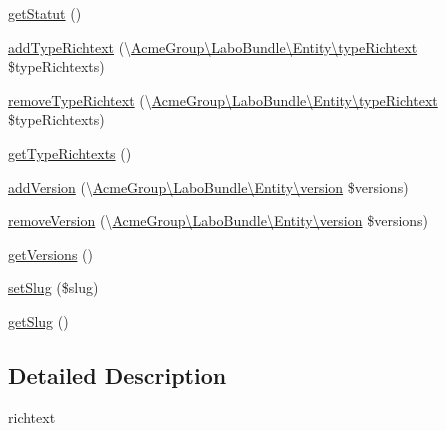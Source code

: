 \begin{DoxyCompactItemize}
\item 
\hyperlink{class_acme_group_1_1_labo_bundle_1_1_entity_1_1richtext_a9f9ecdc25a2044ea5f0a0240daeae640}{get\+Statut} ()
\item 
\hyperlink{class_acme_group_1_1_labo_bundle_1_1_entity_1_1richtext_a7e66b8692ef23d0d57557096c6730960}{add\+Type\+Richtext} (\textbackslash{}\hyperlink{class_acme_group_1_1_labo_bundle_1_1_entity_1_1type_richtext}{Acme\+Group\textbackslash{}\+Labo\+Bundle\textbackslash{}\+Entity\textbackslash{}type\+Richtext} \$type\+Richtexts)
\item 
\hyperlink{class_acme_group_1_1_labo_bundle_1_1_entity_1_1richtext_a8eba4bd29a6202d4532cc1aa1b10c342}{remove\+Type\+Richtext} (\textbackslash{}\hyperlink{class_acme_group_1_1_labo_bundle_1_1_entity_1_1type_richtext}{Acme\+Group\textbackslash{}\+Labo\+Bundle\textbackslash{}\+Entity\textbackslash{}type\+Richtext} \$type\+Richtexts)
\item 
\hyperlink{class_acme_group_1_1_labo_bundle_1_1_entity_1_1richtext_af83d38c1d5ac3e935d25483392b013a7}{get\+Type\+Richtexts} ()
\item 
\hyperlink{class_acme_group_1_1_labo_bundle_1_1_entity_1_1richtext_a33d63dde1c89f4967d323eacb0cb22f1}{add\+Version} (\textbackslash{}\hyperlink{class_acme_group_1_1_labo_bundle_1_1_entity_1_1version}{Acme\+Group\textbackslash{}\+Labo\+Bundle\textbackslash{}\+Entity\textbackslash{}version} \$versions)
\item 
\hyperlink{class_acme_group_1_1_labo_bundle_1_1_entity_1_1richtext_a7bd10636b0e87556ab91821264a5595e}{remove\+Version} (\textbackslash{}\hyperlink{class_acme_group_1_1_labo_bundle_1_1_entity_1_1version}{Acme\+Group\textbackslash{}\+Labo\+Bundle\textbackslash{}\+Entity\textbackslash{}version} \$versions)
\item 
\hyperlink{class_acme_group_1_1_labo_bundle_1_1_entity_1_1richtext_af9898d42aa4cca7707ad32450544cab8}{get\+Versions} ()
\item 
\hyperlink{class_acme_group_1_1_labo_bundle_1_1_entity_1_1richtext_a05c299738782476b26b1646190032ce0}{set\+Slug} (\$slug)
\item 
\hyperlink{class_acme_group_1_1_labo_bundle_1_1_entity_1_1richtext_a9241dbd450e9c48340b9be1ab10acce5}{get\+Slug} ()
\end{DoxyCompactItemize}


\subsection{Detailed Description}
richtext

